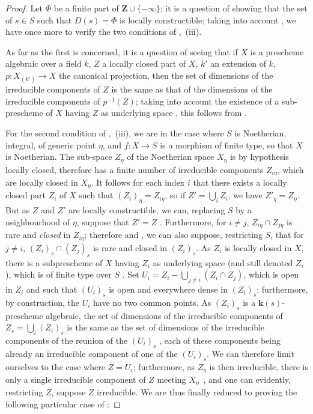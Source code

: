 \begin{proof}
Let $\Phi$ be a finite part of $\mathbf{Z}\cup\{-\infty\}$; it is a question of showing that the set of $s\in S$ such that $D(s)=\Phi$ is locally constructible; taking into account , we have once more to verify the two conditions of ,~(iii).

As far as the first is concerned, it is a question of seeing that if $X$ is a prescheme algebraic over a field $k$, $Z$ a locally closed part of $X$, $k'$ an extension of $k$, $p:X_{(k')}\to X$ the canonical projection, then the set of dimensions of the irreducible components of $Z$ is the same as that of the dimensions of the irreducible components of $p^{-1}(Z)$; taking into account the existence of a sub-prescheme of $X$ having $Z$ as underlying space , this follows from .

For the second condition of ,~(iii), we are in the case where $S$ is Noetherian, integral, of generic point $\eta$, and $f:X\to S$ is a morphism of finite type, so that $X$ is Noetherian.
The sub-space $Z_\eta$ of the Noetherian space $X_\eta$ is by hypothesis locally closed, therefore has a finite number of irreducible components $Z_{i\eta}$, which are locally closed in $X_\eta$.
It follows for each index $i$ that there exists a locally closed part $Z_i$ of $X$ such that $(Z_i)_\eta=Z_{i\eta}$, so if $Z'=\bigcup_i Z_i$, we have $Z'_\eta=Z_\eta$.
But as $Z$ and $Z'$ are locally constructible, we can, replacing $S$ by a neighbourhood of $\eta$, suppose that $Z'=Z$ .
Furthermore, for $i\neq j$, $Z_{i\eta}\cap Z_{j\eta}$ is rare and \emph{closed} in $Z_{i\eta}$; therefore  and , we can also suppose, restricting $S$, that for $j\neq i$, $(Z_i)_s\cap(Z_j)_s$ is rare and closed in $(Z_i)_s$.
As $Z_i$ is locally closed in $X$, there is a subprescheme of $X$ having $Z_i$ as underlying space (and still denoted $Z_i$), which is of finite type over $S$ .
Set $U_i=Z_i-\bigcup_{j\neq i}(Z_i\cap Z_j)$, which is open in $Z_i$ and such that $(U_i)_s$ is open and everywhere dense in $(Z_i)_s$; furthermore, by construction, the $U_i$ have no two common points.
As $(Z_i)_s$ is a $\boldsymbol{k}(s)$-prescheme algebraic, the set of dimensions of the irreducible components of $Z_s=\bigcup_i(Z_i)_s$ is the same as the set of dimensions of the irreducible components of the reunion of the $(U_i)_s$ , each of these components being already an irreducible component of one of the $(U_i)_s$.
We can therefore limit ourselves to the case where $Z=U_i$; furthermore, as $Z_\eta$ is then irreducible, there is only a single irreducible component of $Z$ meeting $X_\eta$~, and one can evidently, restricting $Z$, suppose $Z$ irreducible.
We are thus finally reduced to proving the following particular case of :
\end{proof}

